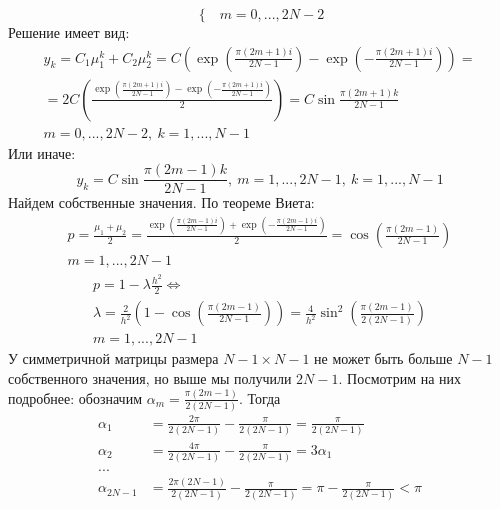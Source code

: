 \documentclass[12pt]{article}
\begin{document}
\begin{enumerate}
\begin{enumerate}
\[\begin{cases}
			            \end{cases} m = 0, ...,2N-2\]
		            Решение имеет вид:
		            \begin{multline*}
			            y_k=C_1\mu_1^k+C_2\mu_2^k=C\left(\exp\left(\frac{\pi(2m+1)i}{2N-1}\right)-\exp\left(-\frac{\pi(2m+1)i}{2N-1}\right)\right)=\\
			            =2C\left(\frac{\exp\left(\frac{\pi(2m+1)i}{2N-1}\right)-\exp\left(-\frac{\pi(2m+1)i}{2N-1}\right)}{2}\right) = C\sin\frac{\pi(2m+1)k}{2N-1}\\
			            m=0,...,2N-2,\ k=1,...,N-1
		            \end{multline*}
		            Или иначе:
		            \[y_k=C\sin\frac{\pi(2m-1)k}{2N-1},\ m=1,...,2N-1,\ k=1,...,N-1\]
		            Найдем собственные значения. По теореме Виета:
		            \begin{multline*}
			            p=\frac{\mu_1+\mu_2}{2}=\frac{\exp\left(\frac{\pi(2m-1)i}{2N-1}\right) + \exp\left(-\frac{\pi(2m-1)i}{2N-1}\right)}{2}=\cos\left(\frac{\pi(2m-1)}{2N-1}\right)\\
			            m=1,...,2N-1
		            \end{multline*}
		            \begin{multline*}
			            p=1-\lambda\frac{h^2}{2}\Leftrightarrow\\\lambda=\frac{2}{h^2}\left(1-\cos\left(\frac{\pi(2m-1)}{2N-1}\right)\right)=\frac{4}{h^2}\sin^2\left(\frac{\pi(2m-1)}{2(2N-1)}\right)\\
			            m=1,...,2N-1
		            \end{multline*}
		            У симметричной матрицы размера $N-1\times N-1$ не может быть больше $N-1$ собственного значения, но выше мы получили $2N-1$.
		            Посмотрим на них подробнее: обозначим $\alpha_m=\frac{\pi(2m-1)}{2(2N-1)}$. Тогда
		            \begin{align*}
			            \alpha_1      & = \frac{2\pi}{2(2N-1)} - \frac{\pi}{2(2N-1)} = \frac{\pi}{2(2N-1)}                   \\
			            \alpha_2      & = \frac{4\pi}{2(2N-1)} - \frac{\pi}{2(2N-1)} = 3\alpha_1                             \\
			            ...           &                                                                                      \\
			            \alpha_{2N-1} & = \frac{2\pi(2N-1)}{2(2N-1)} - \frac{\pi}{2(2N-1)} = \pi - \frac{\pi}{2(2N-1)} < \pi \\

\end{align*}
\end{enumerate}
\end{enumerate}
\end{document}
